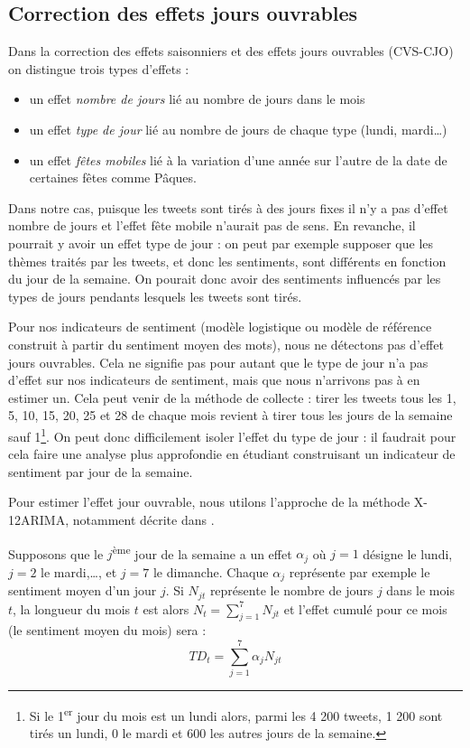 \documentclass[11pt,french,french]{article}
\let\rmarkdownfootnote\footnote%
\def\footnote{\protect\rmarkdownfootnote}
\begin{document}
\hypertarget{sec:cjo}{%
\subsection{Correction des effets jours ouvrables}\label{sec:cjo}}

Dans la correction des effets saisonniers et des effets jours ouvrables (CVS-CJO) on distingue trois types d'effets :

\begin{itemize}
\item
  un effet \emph{nombre de jours} lié au nombre de jours dans le mois
\item
  un effet \emph{type de jour} lié au nombre de jours de chaque type (lundi, mardi\dots)
\item
  un effet \emph{fêtes mobiles} lié à la variation d'une année sur l'autre de la date de certaines fêtes comme Pâques.
\end{itemize}

Dans notre cas, puisque les tweets sont tirés à des jours fixes il n'y a pas d'effet nombre de jours et l'effet fête mobile n'aurait pas de sens.
En revanche, il pourrait y avoir un effet type de jour : on peut par exemple supposer que les thèmes traités par les tweets, et donc les sentiments, sont différents en fonction du jour de la semaine.
On pourait donc avoir des sentiments influencés par les types de jours pendants lesquels les tweets sont tirés.

Pour nos indicateurs de sentiment (modèle logistique ou modèle de référence construit à partir du sentiment moyen des mots), nous ne détectons pas d'effet jours ouvrables.
Cela ne signifie pas pour autant que le type de jour n'a pas d'effet sur nos indicateurs de sentiment, mais que nous n'arrivons pas à en estimer un.
Cela peut venir de la méthode de collecte : tirer les tweets tous les 1, 5, 10, 15, 20, 25 et 28 de chaque mois revient à tirer tous les jours de la semaine sauf 1\footnote{Si le 1\textsuperscript{er} jour du mois est un lundi alors, parmi les 4 200 tweets, 1 200 sont tirés un lundi, 0 le mardi et 600 les autres jours de la semaine.}.
On peut donc difficilement isoler l'effet du type de jour : il faudrait pour cela faire une analyse plus approfondie en étudiant construisant un indicateur de sentiment par jour de la semaine.

Pour estimer l'effet jour ouvrable, nous utilons l'approche de la méthode X-12ARIMA, notamment décrite dans \cite{L2018}.

Supposons que le \(j\)\textsuperscript{ème} jour de la semaine a un effet \(\alpha_j\) où \(j=1\) désigne le lundi, \(j=2\) le mardi,\dots, et \(j=7\) le dimanche.
Chaque \(\alpha_j\) représente par exemple le sentiment moyen d'un jour \(j\).
Si \(N_{jt}\) représente le nombre de jours \(j\) dans le mois \(t\), la longueur du mois \(t\) est alors \(N_t = \sum_{j=1}^{7} N_{jt}\) et l'effet cumulé pour ce mois (le sentiment moyen du mois) sera :
\[
TD_t = \sum_{j=1}^{7} \alpha_j N_{jt}
\]
\end{document}
